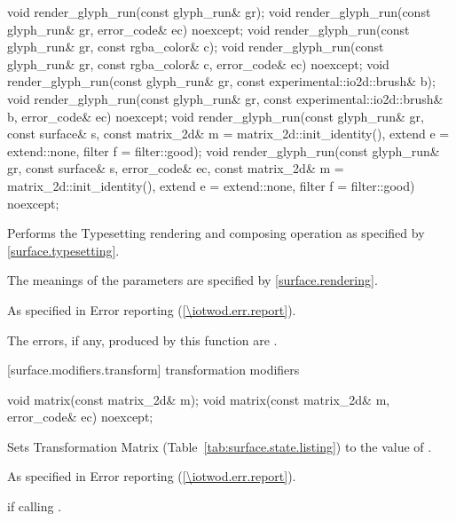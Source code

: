 \begin{itemdecl}
void render_glyph_run(const glyph_run& gr);
void render_glyph_run(const glyph_run& gr, error_code& ec) noexcept;
void render_glyph_run(const glyph_run& gr, const rgba_color& c);
void render_glyph_run(const glyph_run& gr, const rgba_color& c,
  error_code& ec) noexcept;
void render_glyph_run(const glyph_run& gr,
  const experimental::io2d::brush& b);
void render_glyph_run(const glyph_run& gr,
  const experimental::io2d::brush& b, error_code& ec) noexcept;
void render_glyph_run(const glyph_run& gr, const surface& s,
  const matrix_2d& m = matrix_2d::init_identity(), extend e = extend::none,
  filter f = filter::good);
void render_glyph_run(const glyph_run& gr, const surface& s, error_code& ec, 
  const matrix_2d& m = matrix_2d::init_identity(), extend e = extend::none, 
  filter f = filter::good) noexcept;
\end{itemdecl}
\begin{itemdescr}
\pnum
\effects
Performs the Typesetting rendering and composing operation as specified by \ref{surface.typesetting}.

\pnum
The meanings of the parameters are specified by \ref{surface.rendering}.

\pnum
\throws
As specified in Error reporting (\ref{\iotwod.err.report}).

\pnum
\errors
The errors, if any, produced by this function are .
\end{itemdescr}

 [surface.modifiers.transform] { transformation modifiers}

\begin{itemdecl}
void matrix(const matrix_2d& m);
void matrix(const matrix_2d& m, error_code& ec) noexcept;
\end{itemdecl}
\begin{itemdescr}
\pnum
\effects
Sets Transformation Matrix (Table~\ref{tab:surface.state.listing}) to the value of .

\pnum
\throws
As specified in Error reporting (\ref{\iotwod.err.report}).

\pnum
\errors
{} if calling .
\end{itemdescr}


